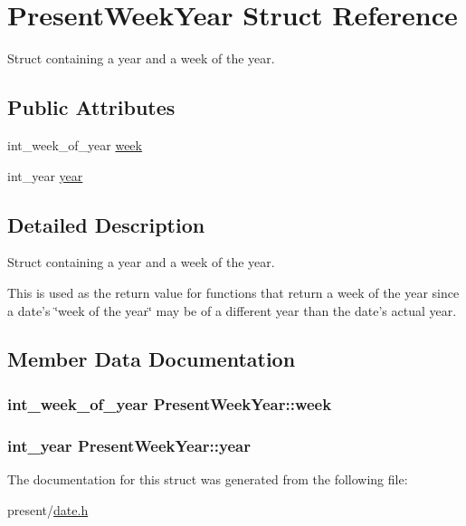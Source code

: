 \hypertarget{structPresentWeekYear}{\section{\-Present\-Week\-Year \-Struct \-Reference}
\label{structPresentWeekYear}
}


\-Struct containing a year and a week of the year.  


\subsection*{\-Public \-Attributes}
\begin{DoxyCompactItemize}
\item 
int\-\_\-week\-\_\-of\-\_\-year \hyperlink{structPresentWeekYear_ae8f39b74d17e2e95155aac883258053d}{week}
\item 
int\-\_\-year \hyperlink{structPresentWeekYear_a243cbb33489ac2fdd8a7eabe6a5bb6ab}{year}
\end{DoxyCompactItemize}


\subsection{\-Detailed \-Description}
\-Struct containing a year and a week of the year. 

\-This is used as the return value for functions that return a week of the year since a date's \char`\"{}week of the year\char`\"{} may be of a different year than the date's actual year. 

\subsection{\-Member \-Data \-Documentation}
\hypertarget{structPresentWeekYear_ae8f39b74d17e2e95155aac883258053d}{
\subsubsection[{week}]{\setlength{\rightskip}{0pt plus 5cm}int\-\_\-week\-\_\-of\-\_\-year {\bf \-Present\-Week\-Year\-::week}}}\label{structPresentWeekYear_ae8f39b74d17e2e95155aac883258053d}
\hypertarget{structPresentWeekYear_a243cbb33489ac2fdd8a7eabe6a5bb6ab}{
\subsubsection[{year}]{\setlength{\rightskip}{0pt plus 5cm}int\-\_\-year {\bf \-Present\-Week\-Year\-::year}}}\label{structPresentWeekYear_a243cbb33489ac2fdd8a7eabe6a5bb6ab}


\-The documentation for this struct was generated from the following file\-:\begin{DoxyCompactItemize}
\item 
present/\hyperlink{date_8h}{date.\-h}\end{DoxyCompactItemize}
